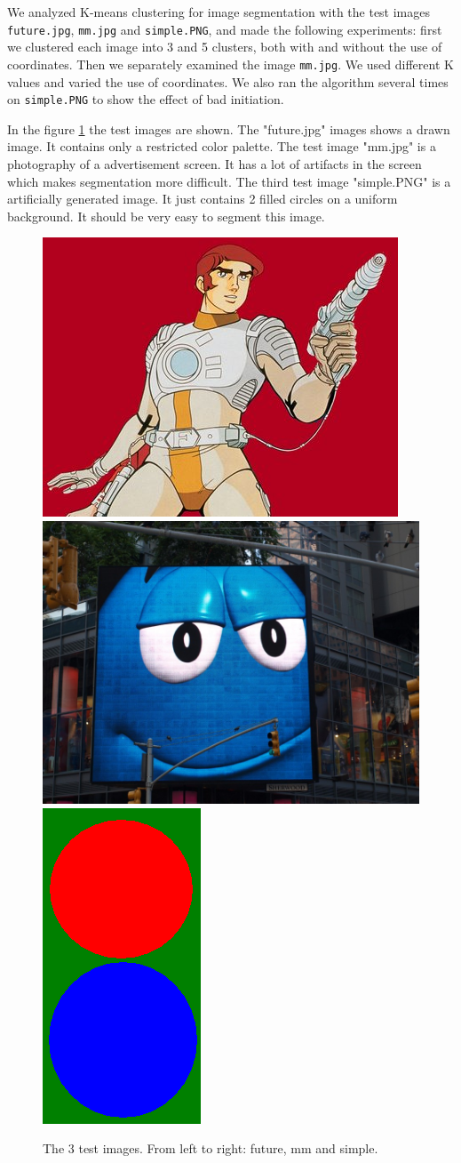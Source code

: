We analyzed K-means clustering for image segmentation with the test images \texttt{future.jpg}, \texttt{mm.jpg} and \texttt{simple.PNG}, and made the following experiments: first we clustered each image into 3 and 5 clusters, both with and without the use of coordinates. Then we separately examined the image \texttt{mm.jpg}. We used different K values and varied the use of coordinates. We also ran the algorithm several times on \texttt{simple.PNG} to show the effect of bad initiation.

In the figure \ref{fig:testimages} the test images are shown. The "future.jpg" images shows a drawn image. It contains only a restricted color palette. The test image "mm.jpg" is a photography of a advertisement screen. It has a lot of artifacts in the screen which makes segmentation more difficult. The third test image "simple.PNG" is a artificially generated image. It just contains 2 filled circles on a uniform background. It should be very easy to segment this image.
\begin{figure}[h]
	\includegraphics[width=0.38\linewidth]{figures/task2/future.jpg}
	\includegraphics[width=0.398\linewidth]{figures/task2/mm.jpg}
	\includegraphics[width=0.15\linewidth]{figures/task2/simple.PNG}
	\caption{The 3 test images. From left to right: future, mm and simple.}
	\label{fig:testimages}
\end{figure}

